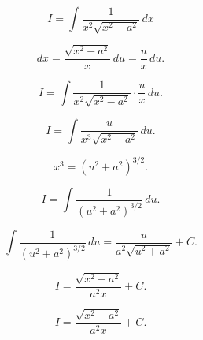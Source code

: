 \documentclass[12pt]{article}
\begin{document}
	

	\[
	I = \int \frac{1}{x^2 \sqrt{x^2 - a^2}} \, dx
	\]


	\[
	dx = \frac{\sqrt{x^2 - a^2}}{x} \, du = \frac{u}{x} \, du.
	\]
	

	\[
	I = \int \frac{1}{x^2 \sqrt{x^2 - a^2}} \cdot \frac{u}{x} \, du.
	\]
	

	\[
	I = \int \frac{u}{x^3 \sqrt{x^2 - a^2}} \, du.
	\]
	

	\[
	x^3 = (u^2 + a^2)^{3/2}.
	\]
	

	\[
	I = \int \frac{1}{(u^2 + a^2)^{3/2}} \, du.
	\]
	

	\[
	\int \frac{1}{(u^2 + a^2)^{3/2}} \, du = \frac{u}{a^2 \sqrt{u^2 + a^2}} + C.
	\]
	

	\[
	I = \frac{\sqrt{x^2 - a^2}}{a^2 x} + C.
	\]
	

	\[
	I = \frac{\sqrt{x^2 - a^2}}{a^2 x} + C.
	\]
	
\end{document}
